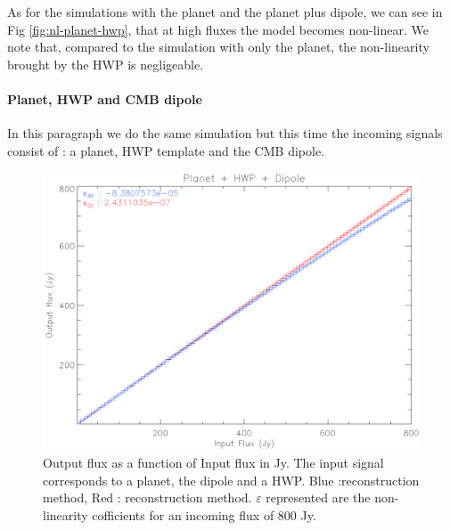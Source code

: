 As for the simulations with the planet and the planet plus dipole, we can see in Fig \ref{fig:nl-planet-hwp}, that at high fluxes the model becomes non-linear. We note that, compared to the simulation with only the planet, the non-linearity brought by the HWP is negligeable.

\paragraph{Planet, HWP and CMB dipole \\}

In this paragraph we do the same simulation but this time the incoming signals consist of : a planet, HWP template and the CMB dipole.

\begin{figure}[h]
\center
	\includegraphics[scale=0.5]{Figures/nl-planet-hwp-dipole.eps}
	\caption{Output flux as a function of Input flux in Jy. The input signal corresponds to a planet, the dipole and a HWP. Blue :\rf reconstruction method, Red : \cf reconstruction method. $\varepsilon$  represented are the non-linearity cofficients for an incoming flux of 800 Jy.}
	\label{fig:nl-planet-hwp-dipole}
\end{figure}

